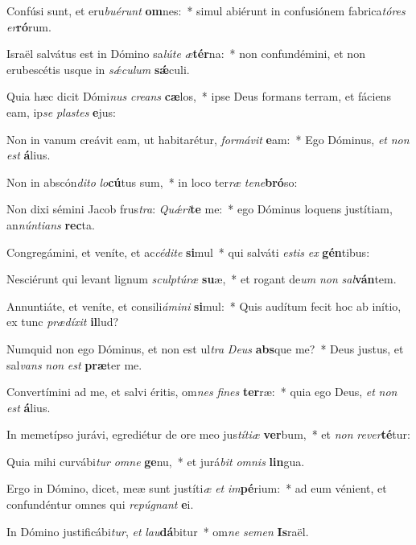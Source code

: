 \item Confúsi sunt, et eru\textit{bu}\textit{é}\textit{runt} \textbf{om}nes:~* simul abiérunt in confusiónem fabrica\textit{tó}\textit{res} \textit{er}\textbf{ró}rum.
\item Israël salvátus est in Dómino sa\textit{lú}\textit{te} \textit{æ}\textbf{tér}na:~* non confundémini, et non erubescétis usque in \textit{sǽ}\textit{cu}\textit{lum} \textbf{sǽ}culi.
\item Quia hæc dicit Dómi\textit{nus} \textit{cre}\textit{ans} \textbf{cæ}los,~* ipse Deus formans terram, et fáciens eam, ip\textit{se} \textit{plas}\textit{tes} \textbf{e}jus:
\item Non in vanum creávit eam, ut habitarétur, \textit{for}\textit{má}\textit{vit} \textbf{e}am:~* Ego Dóminus, \textit{et} \textit{non} \textit{est} \textbf{á}lius.
\item Non in abscón\textit{di}\textit{to} \textit{lo}\textbf{cú}tus sum,~* in loco ter\textit{ræ} \textit{te}\textit{ne}\textbf{bró}so:
\item Non dixi sémini Jacob frus\textit{tra}: \textit{Quǽ}\textit{ri}\textbf{te} me:~* ego Dóminus loquens justítiam, an\textit{nún}\textit{ti}\textit{ans} \textbf{rec}ta.
\item Congregámini, et veníte, et ac\textit{cé}\textit{di}\textit{te} \textbf{si}mul~* qui salváti \textit{es}\textit{tis} \textit{ex} \textbf{gén}tibus:
\item Nesciérunt qui levant lignum \textit{sculp}\textit{tú}\textit{ræ} \textbf{su}æ,~* et rogant de\textit{um} \textit{non} \textit{sal}\textbf{ván}tem.
\item Annuntiáte, et veníte, et consili\textit{á}\textit{mi}\textit{ni} \textbf{si}mul:~* Quis audítum fecit hoc ab inítio, ex tunc \textit{præ}\textit{dí}\textit{xit} \textbf{il}lud?
\item Numquid non ego Dóminus, et non est ul\textit{tra} \textit{De}\textit{us} \textbf{abs}que me?~* Deus justus, et sal\textit{vans} \textit{non} \textit{est} \textbf{præ}ter me.
\item Convertímini ad me, et salvi éritis, om\textit{nes} \textit{fi}\textit{nes} \textbf{ter}ræ:~* quia ego Deus, \textit{et} \textit{non} \textit{est} \textbf{á}lius.
\item In memetípso jurávi, egrediétur de ore meo jus\textit{tí}\textit{ti}\textit{æ} \textbf{ver}bum,~* et \textit{non} \textit{re}\textit{ver}\textbf{té}tur:
\item Quia mihi curvábi\textit{tur} \textit{om}\textit{ne} \textbf{ge}nu,~* et jurá\textit{bit} \textit{om}\textit{nis} \textbf{lin}gua.
\item Ergo in Dómino, dicet, meæ sunt justíti\textit{æ} \textit{et} \textit{im}\textbf{pé}rium:~* ad eum vénient, et confundéntur omnes qui \textit{re}\textit{pú}\textit{gnant} \textbf{e}i.
\item In Dómino justificábi\textit{tur}, \textit{et} \textit{lau}\textbf{dá}bitur~* om\textit{ne} \textit{se}\textit{men} \textbf{Is}raël.
